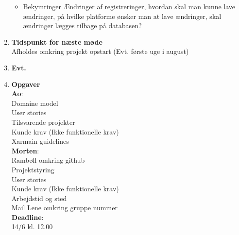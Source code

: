 \begin{enumerate}
\begin{itemize}[-]
			\item Bekymringer
			Ændringer af registreringer, hvordan skal man kunne lave ændringer, på hvilke platforme ønsker man at lave ændringer, skal ændringer lægges tilbage på databasen?
		\end{itemize}
	
		\item \textbf{Tidspunkt for næste møde} \\
		Afholdes omkring projekt opstart (Evt. første uge i august) \\
		\item \textbf{Evt.}
		
		\item \textbf{Opgaver} \\
		\textbf{Ao}: \\
		Domaine model \\
		User stories \\
		Tilsvarende projekter \\
		Kunde krav (Ikke funktionelle krav) \\
		Xarmain guidelines \\
		
		\textbf{Morten}: \\
		Rambøll omkring github \\
		Projektstyring \\
		User stories \\
		Kunde krav (Ikke funktionelle krav) \\
		Arbejdstid og sted \\
		Mail Lene omkring gruppe nummer \\
		
		\textbf{Deadline}: \\
		14/6 kl. 12.00
	\end{enumerate}
